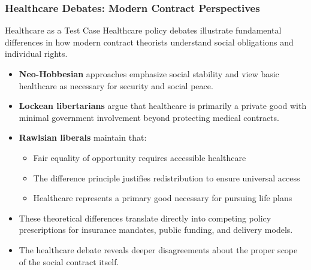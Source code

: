 \documentclass[aspectratio=169]{beamer}
\begin{document}
\begin{frame}
  \frametitle{Healthcare Debates: Modern Contract Perspectives}
  
  \begin{block}{Healthcare as a Test Case}
    Healthcare policy debates illustrate fundamental differences in how modern contract theorists understand social obligations and individual rights.
  \end{block}
  
  \begin{itemize}
    \item \textbf{Neo-Hobbesian} approaches emphasize social stability and view basic healthcare as necessary for security and social peace.
    \item \textbf{Lockean libertarians} argue that healthcare is primarily a private good with minimal government involvement beyond protecting medical contracts.
    \item \textbf{Rawlsian liberals} maintain that:
      \begin{itemize}
        \item Fair equality of opportunity requires accessible healthcare
        \item The difference principle justifies redistribution to ensure universal access
        \item Healthcare represents a primary good necessary for pursuing life plans
      \end{itemize}
    \item These theoretical differences translate directly into competing policy prescriptions for insurance mandates, public funding, and delivery models.
    \item The healthcare debate reveals deeper disagreements about the proper scope of the social contract itself.
  \end{itemize}
\end{frame}
\end{document}
